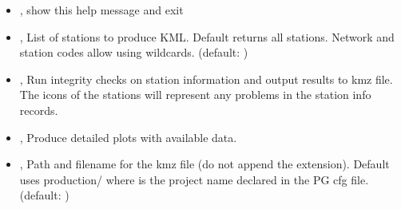 \documentclass[letterpaper,10pt,english]{sphinxmanual}
\begin{document}
\label{\detokenize{parallel_gamit:GenerateKml.py-options}}\begin{itemize}
\item {} 
\sphinxAtStartPar
{\hyperref[\detokenize{parallel_gamit:GenerateKml.py--h}]{}}, {\hyperref[\detokenize{parallel_gamit:GenerateKml.py---help}]{}} \sphinxhyphen{} show this help message and exit

\item {} 
\sphinxAtStartPar
{\hyperref[\detokenize{parallel_gamit:GenerateKml.py--stn}]{}} , {\hyperref[\detokenize{parallel_gamit:GenerateKml.py---station_list}]{}}  \sphinxhyphen{} List of stations to produce KML. Default returns all stations. Network and station codes allow using wildcards. (default: \sphinxcode{\sphinxupquote{{[}{]}}})

\item {} 
\sphinxAtStartPar
{\hyperref[\detokenize{parallel_gamit:GenerateKml.py--stninfo}]{}}, {\hyperref[\detokenize{parallel_gamit:GenerateKml.py---station_info}]{}} \sphinxhyphen{} Run integrity checks on station information and output results to kmz file. The icons of the stations will represent any problems in the station info records.

\item {} 
\sphinxAtStartPar
{\hyperref[\detokenize{parallel_gamit:GenerateKml.py--data}]{}}, {\hyperref[\detokenize{parallel_gamit:GenerateKml.py---available_data}]{}} \sphinxhyphen{} Produce detailed plots with available data.

\item {} 
\sphinxAtStartPar
{\hyperref[\detokenize{parallel_gamit:GenerateKml.py--kmz}]{}} , {\hyperref[\detokenize{parallel_gamit:GenerateKml.py---kmz_filename}]{}}  \sphinxhyphen{} Path and filename for the kmz file (do not append the extension). Default uses production/ where  is the project name declared in the PG cfg file. (default: )


\end{itemize}
\end{document}
